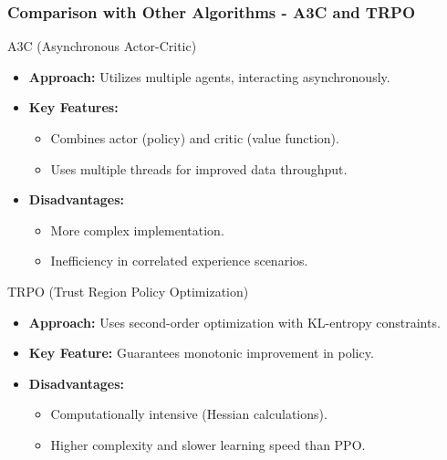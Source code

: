 \documentclass{beamer}
\begin{document}
\begin{frame}[fragile]
    \frametitle{Comparison with Other Algorithms - A3C and TRPO}
    \begin{block}{A3C (Asynchronous Actor-Critic)}
        \begin{itemize}
            \item \textbf{Approach:} Utilizes multiple agents, interacting asynchronously.
            \item \textbf{Key Features:}
                \begin{itemize}
                    \item Combines actor (policy) and critic (value function).
                    \item Uses multiple threads for improved data throughput.
                \end{itemize}
            \item \textbf{Disadvantages:}
                \begin{itemize}
                    \item More complex implementation.
                    \item Inefficiency in correlated experience scenarios.
                \end{itemize}
        \end{itemize}
    \end{block}
    
    \begin{block}{TRPO (Trust Region Policy Optimization)}
        \begin{itemize}
            \item \textbf{Approach:} Uses second-order optimization with KL-entropy constraints.
            \item \textbf{Key Feature:} Guarantees monotonic improvement in policy.
            \item \textbf{Disadvantages:}
                \begin{itemize}
                    \item Computationally intensive (Hessian calculations).
                    \item Higher complexity and slower learning speed than PPO.
                \end{itemize}
        \end{itemize}
    \end{block}
\end{frame}
\end{document}
